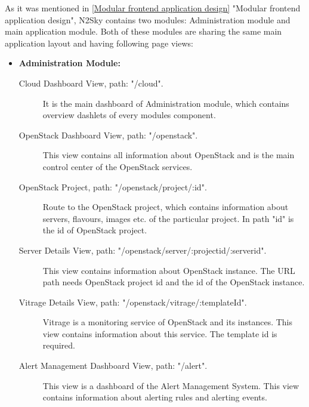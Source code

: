 As it was mentioned in \autoref{Modular frontend application design} "Modular frontend application design", N2Sky contains two modules: Administration module and main application module. Both of these modules are sharing the same main application layout and having following page views: 
\begin{itemize}
\item \textbf{Administration Module:}
\begin{description}
\item[Cloud Dashboard View, path: "/cloud".] It is the main dashboard of Administration module, which contains overview dashlets of every modules component.
\item[OpenStack Dashboard View, path: "/openstack".] This view contains all information about OpenStack and is the main control center of the OpenStack services.
\item[OpenStack Project, path: "/openstack/project/:id".] Route to the OpenStack project, which contains information about servers, flavours, images etc. of the particular project. In path "id" is the id of OpenStack project.
\item[Server Details View, path: "/openstack/server/:projectid/:serverid".] This view contains information about OpenStack instance. The URL path needs OpenStack project id and the id of the OpenStack instance. 
\item[Vitrage Details View, path: "/openstack/vitrage/:templateId".] Vitrage is a monitoring service of OpenStack and its instances. This view contains information about this service. The template id is required.
\item[Alert Management Dashboard View, path: "/alert".]  This view is a dashboard of the Alert Management System. This view contains information about alerting rules and alerting events.
\end{description}


\end{itemize}
